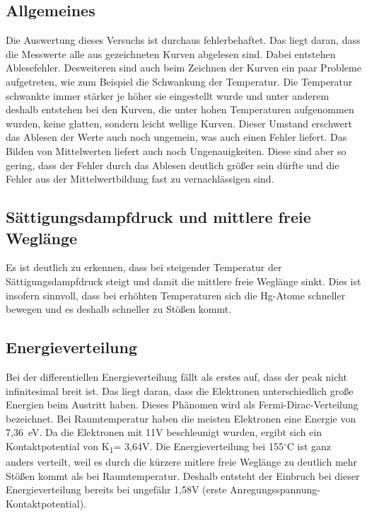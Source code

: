 \subsection{Allgemeines}

Die Auswertung dieses Versuchs ist durchaus fehlerbehaftet. Das liegt daran, dass die Messwerte alle aus gezeichneten Kurven abgelesen sind. Dabei entstehen Ablesefehler. Desweiteren sind auch beim Zeichnen der Kurven ein paar Probleme aufgetreten, wie zum Beispiel die Schwankung der Temperatur. Die Temperatur schwankte immer stärker je höher sie eingestellt wurde und unter anderem deshalb entstehen bei den Kurven, die unter hohen Temperaturen aufgenommen wurden, keine glatten, sondern leicht wellige Kurven. Dieser Umstand erschwert das Ablesen der Werte auch noch ungemein, was auch einen Fehler liefert. Das Bilden von Mittelwerten liefert auch noch Ungenauigkeiten. Diese sind aber so gering, dass der Fehler durch das Ablesen deutlich größer sein dürfte und die Fehler aus der Mittelwertbildung fast zu vernachlässigen sind.


\subsection{Sättigungsdampfdruck und mittlere freie Weglänge}

Es ist deutlich zu erkennen, dass bei steigender Temperatur der Sättigungsdampfdruck steigt und damit die mittlere freie Weglänge sinkt. Dies ist insofern sinnvoll, dass bei erhöhten Temperaturen sich die Hg-Atome schneller bewegen und es deshalb schneller zu Stößen kommt.

\subsection{Energieverteilung}

Bei der differentiellen Energieverteilung fällt als erstes auf, dass der peak nicht infinitesimal breit ist. Das liegt daran, dass die Elektronen unterschiedlich große Energien beim Austritt haben. Dieses Phänomen wird als Fermi-Dirac-Verteilung bezeichnet. Bei Raumtemperatur haben die meisten Elektronen eine Energie von 7,36\, eV. Da die Elektronen mit 11V beschleunigt wurden, ergibt sich ein Kontaktpotential von K\textsubscript{1}= 3,64V. Die Energieverteilung bei 155$^\circ$C ist ganz anders verteilt, weil es durch die kürzere mitlere freie Weglänge zu deutlich mehr Stößen kommt als bei Raumtemperatur. Deshalb entsteht der Einbruch bei dieser Energieverteilung bereits bei ungefähr 1,58V (erste Anregungsspannung-Kontaktpotential).


